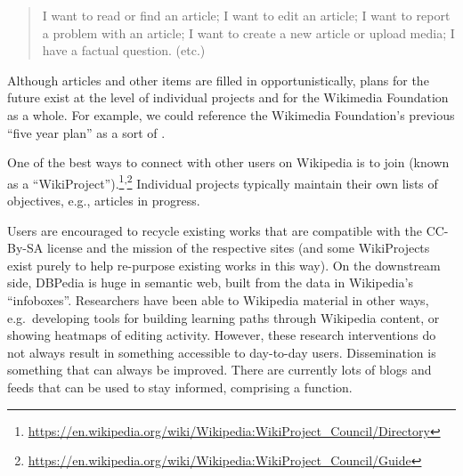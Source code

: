 \begin{quotation}
\noindent 
I want to read or find an article;
I want to edit an article;
I want to report a problem with an article;
I want to create a new article or upload media;
I have a factual question.
(etc.)
\end{quotation}
%
%
%
%
Although articles and other items are filled in opportunistically,
plans for the future exist at the level of individual projects and for
the Wikimedia Foundation as a whole.  For example, we could reference
the Wikimedia Foundation's previous ``five year plan'' as a sort of
.



One of the best ways to connect with other users on Wikipedia is to
join  (known as a
``WikiProject'').\footnote{\url{https://en.wikipedia.org/wiki/Wikipedia:WikiProject_Council/Directory}}\textsuperscript{,}\footnote{\url{https://en.wikipedia.org/wiki/Wikipedia:WikiProject_Council/Guide}}
Individual projects typically maintain their own lists of objectives,
e.g., articles in progress.

Users are encouraged to recycle existing works that are compatible
with the CC-By-SA license and the mission of the respective sites (and
some WikiProjects exist purely to help re-purpose existing works in
this way).  On the downstream side, DBPedia is huge in semantic web,
built from the data in Wikipedia's ``infoboxes''.  Researchers have
been able to  Wikipedia material
in other ways, e.g.~developing tools for building learning paths
through Wikipedia content, or showing heatmaps of editing activity.
However, these research interventions do not always result in
something accessible to day-to-day users.  Dissemination is something
that can always be improved.  There are currently lots of blogs and
feeds that can be used to stay informed, comprising a
 function.

